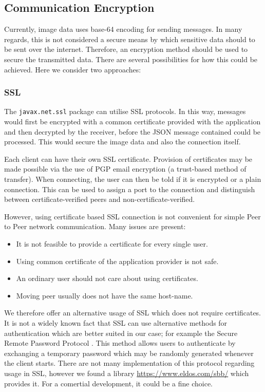 \documentclass[10pt, a4paper]{article}
\begin{document}
\subsection{Communication Encryption}

Currently, image data uses base-64 encoding for sending messages.
In many regards, this is not considered a secure means by which sensitive data should to be sent over the internet.
Therefore, an encryption method should be used to secure the transmitted data.
There are several possibilities for how this could be achieved.
Here we consider two approaches:

\subsubsection{SSL}

The \verb|javax.net.ssl| package can utilise SSL protocols.
In this way, messages would first be encrypted with a common certificate provided with the application and then decrypted by the receiver, before the JSON message contained could be processed.
This would secure the image data and also the connection itself.

Each client can have their own SSL certificate.
Provision of certificates may be made possible via the use of PGP email encryption (a trust-based method of transfer).
When connecting, the user can then be told if it is encrypted or a plain connection.
This can be used to assign a port to the connection and distinguish between certificate-verified peers and non-certificate-verified.

However, using certificate based SSL connection is not convenient for simple Peer to Peer network communication.
Many issues are present:
\begin{itemize}
	\item It is not feasible to provide a certificate for every single user.
	\item Using common certificate of the application provider is not safe.
	\item An ordinary user should not care about using certificates.
	\item Moving peer usually does not have the same host-name.
\end{itemize}

We therefore offer an alternative usage of SSL which does not require certificates.
It is not a widely known fact that SSL can use alternative methods for authentication which are better suited in our case; for example the Secure Remote Password Protocol \cite{srp}.
This method allows users to authenticate by exchanging a temporary password which may be randomly generated whenever the client starts.
There are not many implementation of this protocol regarding usage in SSL, however we found a library \href{SecureBlackBox}{https://www.eldos.com/sbb/} which provides it.
For a comertial development, it could be a fine choice.
\end{document}
